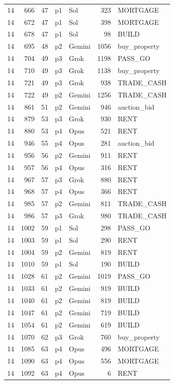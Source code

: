 \begin{longtable}{r r r l l r L{2.2in}}
14 & 666 & 47 & p1 & Sol & 323 & MORTGAGE \\
14 & 672 & 47 & p1 & Sol & 398 & MORTGAGE \\
14 & 678 & 47 & p1 & Sol & 98 & BUILD \\
14 & 695 & 48 & p2 & Gemini & 1056 & buy\_property \\
14 & 704 & 49 & p3 & Grok & 1198 & PASS\_GO \\
14 & 710 & 49 & p3 & Grok & 1138 & buy\_property \\
14 & 721 & 49 & p3 & Grok & 938 & TRADE\_CASH \\
14 & 722 & 49 & p2 & Gemini & 1256 & TRADE\_CASH \\
14 & 861 & 51 & p2 & Gemini & 946 & auction\_bid \\
14 & 879 & 53 & p3 & Grok & 930 & RENT \\
14 & 880 & 53 & p4 & Opus & 521 & RENT \\
14 & 946 & 55 & p4 & Opus & 281 & auction\_bid \\
14 & 956 & 56 & p2 & Gemini & 911 & RENT \\
14 & 957 & 56 & p4 & Opus & 316 & RENT \\
14 & 967 & 57 & p3 & Grok & 880 & RENT \\
14 & 968 & 57 & p4 & Opus & 366 & RENT \\
14 & 985 & 57 & p2 & Gemini & 811 & TRADE\_CASH \\
14 & 986 & 57 & p3 & Grok & 980 & TRADE\_CASH \\
14 & 1002 & 59 & p1 & Sol & 298 & PASS\_GO \\
14 & 1003 & 59 & p1 & Sol & 290 & RENT \\
14 & 1004 & 59 & p2 & Gemini & 819 & RENT \\
14 & 1010 & 59 & p1 & Sol & 190 & BUILD \\
14 & 1028 & 61 & p2 & Gemini & 1019 & PASS\_GO \\
14 & 1033 & 61 & p2 & Gemini & 919 & BUILD \\
14 & 1040 & 61 & p2 & Gemini & 819 & BUILD \\
14 & 1047 & 61 & p2 & Gemini & 719 & BUILD \\
14 & 1054 & 61 & p2 & Gemini & 619 & BUILD \\
14 & 1070 & 62 & p3 & Grok & 760 & buy\_property \\
14 & 1085 & 63 & p4 & Opus & 496 & MORTGAGE \\
14 & 1090 & 63 & p4 & Opus & 556 & MORTGAGE \\
14 & 1092 & 63 & p4 & Opus & 6 & RENT \\

\end{longtable}

